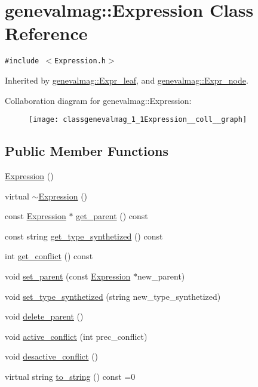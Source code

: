 \hypertarget{classgenevalmag_1_1Expression}{
\section{genevalmag::Expression Class Reference}
\label{classgenevalmag_1_1Expression}
}
{\tt \#include $<$Expression.h$>$}

Inherited by \hyperlink{classgenevalmag_1_1Expr__leaf}{genevalmag::Expr\_\-leaf}, and \hyperlink{classgenevalmag_1_1Expr__node}{genevalmag::Expr\_\-node}.

Collaboration diagram for genevalmag::Expression:\nopagebreak
\begin{figure}[H]
\begin{center}
\leavevmode
\texttt{[image: classgenevalmag\_1\_1Expression\_\_coll\_\_graph]}
\end{center}
\end{figure}
\subsection*{Public Member Functions}
\begin{CompactItemize}
\item 
\hyperlink{classgenevalmag_1_1Expression_249f080918dd3203c7dfc8e9e691bc50}{Expression} ()
\item 
virtual \hyperlink{classgenevalmag_1_1Expression_9ab15992e6a819e8e683745069bcf15b}{$\sim$Expression} ()
\item 
const \hyperlink{classgenevalmag_1_1Expression}{Expression} $\ast$ \hyperlink{classgenevalmag_1_1Expression_21b78e4077b2c9d41076f8c798996f34}{get\_\-parent} () const 
\item 
const string \hyperlink{classgenevalmag_1_1Expression_70ea402fd43f8c588c83196bc4a10183}{get\_\-type\_\-synthetized} () const 
\item 
int \hyperlink{classgenevalmag_1_1Expression_feaeebdfea5e8422299d152f8334034a}{get\_\-conflict} () const 
\item 
void \hyperlink{classgenevalmag_1_1Expression_cba3103fd864eacfefdecb88e597de1f}{set\_\-parent} (const \hyperlink{classgenevalmag_1_1Expression}{Expression} $\ast$new\_\-parent)
\item 
void \hyperlink{classgenevalmag_1_1Expression_22920a0309ce122eb22553898ec0108f}{set\_\-type\_\-synthetized} (string new\_\-type\_\-synthetized)
\item 
void \hyperlink{classgenevalmag_1_1Expression_bfc415a5ddd5ae05b1e9610a2f347203}{delete\_\-parent} ()
\item 
void \hyperlink{classgenevalmag_1_1Expression_6c1265f335e85346c23556cc361c4aad}{active\_\-conflict} (int prec\_\-conflict)
\item 
void \hyperlink{classgenevalmag_1_1Expression_a851daf99e3e04b3cf2bb2c7d53811f8}{desactive\_\-conflict} ()
\item 
virtual string \hyperlink{classgenevalmag_1_1Expression_8685f44429501da942b1fe76880af6fe}{to\_\-string} () const =0
\end{CompactItemize}
